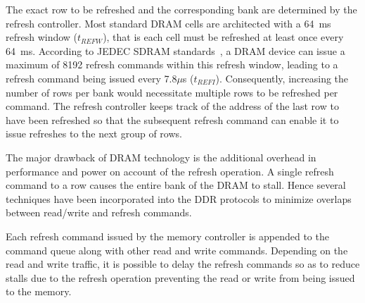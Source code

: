 The exact row to be refreshed and the corresponding bank are determined by the refresh controller. Most standard DRAM cells are architected with a 64~ms refresh window ($t_{REFW}$), that is each cell must be refreshed at least once every 64~ms. According to JEDEC SDRAM standards~\cite{jedec-sdram-standards}, a DRAM device can issue a maximum of 8192 refresh commands within this refresh window, leading to a refresh command being issued every 7.8$\mu$s ($t_{REFI}$). Consequently, increasing the number of rows per bank would necessitate multiple rows to be refreshed per command. The refresh controller keeps track of the address of the last row to have been refreshed so that the subsequent refresh command can enable it to issue refreshes to the next group of rows.

The major drawback of DRAM technology is the additional overhead in performance and power on account of the refresh operation. A single refresh command to a row causes the entire bank of the DRAM to stall. Hence several techniques have been incorporated into the DDR protocols to minimize overlaps between read/write and refresh commands.

Each refresh command issued by the memory controller is appended to the command queue along with other read and write commands. Depending on the read and write traffic, it is possible to delay the refresh commands so as to reduce stalls due to the refresh operation preventing the read or write from being issued to the memory. 

